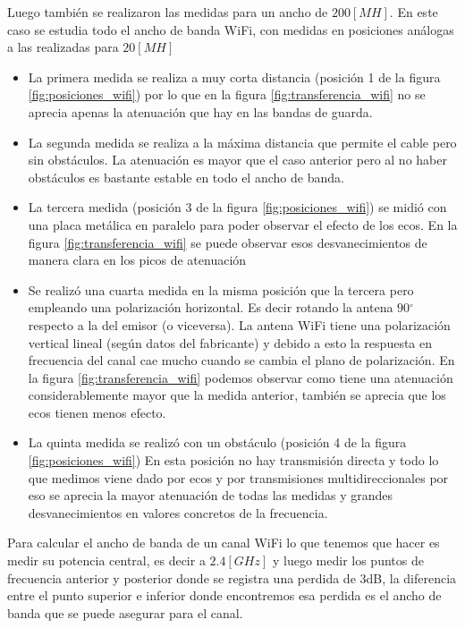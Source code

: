 \documentclass[10pt,conference,a4paper]{IEEEtran}
\newcommand{\degree}{\ensuremath{^\circ}}
\begin{document}
Luego también se realizaron las medidas para un ancho de $200[MH]$. En este caso se estudia todo el ancho de banda WiFi, con medidas en posiciones análogas a las realizadas para $20[MH]$
\begin{itemize}
    \item La primera medida se realiza a muy corta distancia (posición 1 de la figura \ref{fig:posiciones_wifi}) por lo que en la figura \ref{fig:transferencia_wifi} no se aprecia apenas la atenuación que hay en las bandas de guarda.
    \item La segunda medida se realiza a la máxima distancia que permite el cable pero sin obstáculos. La atenuación es mayor que el caso anterior pero al no haber obstáculos es bastante estable en todo el ancho de banda.
    \item La tercera medida (posición 3 de la figura \ref{fig:posiciones_wifi}) se midió con una placa metálica en paralelo para poder observar el efecto de los ecos. En la figura \ref{fig:transferencia_wifi} se puede observar esos desvanecimientos de manera clara en los picos de atenuación
    \item Se realizó una cuarta medida en la misma posición que la tercera pero empleando una polarización horizontal. Es decir rotando la antena $90\degree$ respecto a la del emisor (o viceversa). La antena WiFi tiene una polarización vertical lineal (según datos del fabricante) y debido a esto la respuesta en frecuencia del canal cae mucho cuando se cambia el plano de polarización. En la figura \ref{fig:transferencia_wifi} podemos observar como tiene una atenuación considerablemente mayor que la medida anterior, también se aprecia que los ecos tienen menos efecto.
    \item La quinta medida se realizó con un obstáculo (posición 4 de la figura \ref{fig:posiciones_wifi}) En esta posición no hay transmisión directa y todo lo que medimos viene dado por ecos y por transmisiones multidireccionales por eso se aprecia la mayor atenuación de todas las medidas y grandes desvanecimientos en valores concretos de la frecuencia.
\end{itemize}

Para calcular el ancho de banda de un canal WiFi lo que tenemos que hacer es medir su potencia central, es decir a $2.4[GHz]$ y luego medir los puntos de frecuencia anterior y posterior donde se registra una perdida de 3dB, la diferencia entre el punto superior e inferior donde encontremos esa perdida es el ancho de banda que se puede asegurar para el canal.
\end{document}

